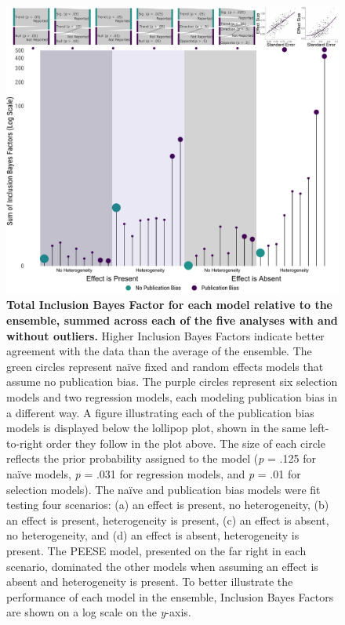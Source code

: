 \documentclass[
  11pt,
  doc, donotrepeattitle,floatsintext]{apa7}
\begin{document}
\clearpage

\begin{figure}

{\centering \includegraphics{../../figs/fig3} 

}

\caption{\footnotesize \normalfont \textbf{Total Inclusion Bayes Factor for each model relative to the ensemble, summed across each of the five analyses with and without outliers.} Higher Inclusion Bayes Factors indicate better agreement with the data than the average of the ensemble. The green circles represent naïve fixed and random effects models that assume no publication bias. The purple circles represent six selection models and two regression models, each modeling publication bias in a different way. A figure illustrating each of the publication bias models is displayed below the lollipop plot, shown in the same left-to-right order they follow in the plot above. The size of each circle reflects the prior probability assigned to the model (\emph{p} = .125 for naïve models, \emph{p} = .031 for regression models, and \emph{p} = .01 for selection models). The naïve and publication bias models were fit testing four scenarios: (a) an effect is present, no heterogeneity, (b) an effect is present, heterogeneity is present, (c) an effect is absent, no heterogeneity, and (d) an effect is absent, heterogeneity is present. The PEESE model, presented on the far right in each scenario, dominated the other models when assuming an effect is absent and heterogeneity is present. To better illustrate the performance of each model in the ensemble, Inclusion Bayes Factors are shown on a log scale on the \emph{y}-axis.}\label{fig:fig3}
\end{figure}
\end{document}

